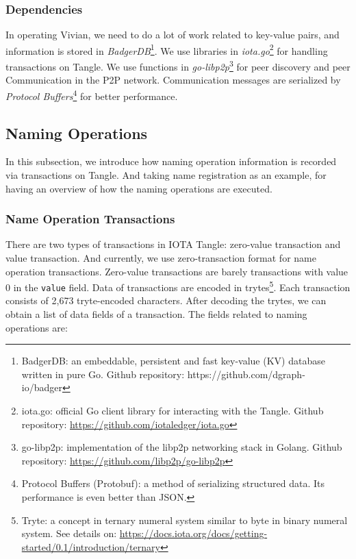 \subsubsection{Dependencies} In operating Vivian, we need to do a lot of work related to key-value pairs, and information is stored in \textit{BadgerDB}\footnote{BadgerDB: an embeddable, persistent and fast key-value (KV) database written in pure Go. Github repository: https://github.com/dgraph-io/badger}.
We use libraries in \textit{iota.go}\footnote{iota.go: official Go client library for interacting with the Tangle. Github repository: \url{https://github.com/iotaledger/iota.go}} for handling transactions on Tangle.
We use functions in \textit{go-libp2p}\footnote{go-libp2p: implementation of the libp2p networking stack in Golang. Github repository: \url{https://github.com/libp2p/go-libp2p}} for peer discovery and peer Communication in the P2P network.
Communication messages are serialized by \textit{Protocol Buffers}\footnote{Protocol Buffers (Protobuf):  a method of serializing structured data. Its performance is even better than JSON.} for better performance.

\subsection{Naming Operations}
In this subsection, we introduce how naming operation information is recorded via transactions on Tangle. And taking name registration as an example, for having an overview of how the naming operations are executed.

\subsubsection{Name Operation Transactions} There are two types of transactions in IOTA Tangle: zero-value transaction and value transaction. And currently, we use zero-transaction format for name operation transactions.
Zero-value transactions are barely transactions with value 0 in the \texttt{value} field.
Data of transactions are encoded in trytes\footnote{Tryte: a concept in ternary numeral system similar to byte in binary numeral system. See details on: \url{https://docs.iota.org/docs/getting-started/0.1/introduction/ternary}}.
Each transaction consists of 2,673 tryte-encoded characters. After decoding the trytes, we can obtain a list of data fields of a transaction. The fields related to naming operations are:

